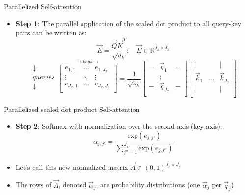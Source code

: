 \begin{vbframe}{Parallelized Self-attention}

\vfill

\begin{itemize}
\item \textbf{Step 1}: The parallel application of the scaled dot product to all query-key pairs can be written as:
$$\vec {E} = \frac{ \vec {Q} \vec {K}^T}{\sqrt{d_k}}; \quad \vec E \in \mathbb{R}^{J_x \times J_x}$$
$$ \begin{matrix} \downarrow \\ queries \\ \downarrow \\ \end{matrix} \overset{\rightarrow keys \rightarrow}{
\begin{bmatrix}
e_{1,1} & \ldots & e_{1,J_x} \\
\vdots & \ddots & \vdots \\
e_{J_x,1} & \ldots & e_{J_x,J_x} \\
\end{bmatrix}} = \frac{1}{\sqrt{d_k}}
\begin{bmatrix} 
- & \vec q_1  & -  \\
& \vdots & \\
-  & \vec q_{J_x}  &  -  \\
\end{bmatrix}  
\begin{bmatrix} 
\lvert &  & \lvert  \\
\vec k_1 & \ldots & \vec k_{J_x} \\
\lvert &  & \lvert  \\
\end{bmatrix}$$
\end{itemize}

\vfill

\end{vbframe}


\begin{vbframe}{Parallelized scaled dot product Self-attention}

\vfill

\begin{itemize}
\item \textbf{Step 2}: Softmax with normalization over the second axis (key axis): 
$$\alpha_{j,j'} = \frac{\mathrm{exp}(e_{j,j'})}{\sum_{j''=1}^{J_x} \mathrm{exp}(e_{j,j''})}$$
\item Let's call this new normalized matrix $\vec A \in (0,1)^{J_x \times J_x}$
\item The rows of $\vec A$, denoted $\vec \alpha_j$, are probability distributions (one $\vec \alpha_j$ per $\vec q_j$)
\end{itemize}

\vfill

\end{vbframe}

